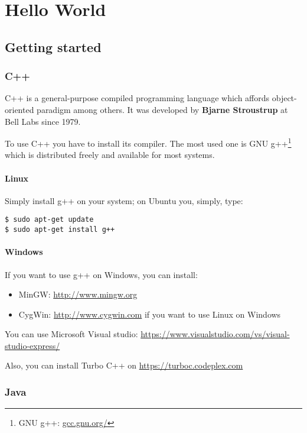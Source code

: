 \documentclass{KBook}
\begin{document}
	\chapter{Hello World}
\fi



\section{Getting started}

\subsection{C++}

C++ is a general-purpose compiled programming language which affords object-oriented paradigm among others. 
It was developed by \textbf{Bjarne Stroustrup} at Bell Labs since 1979.

To use C++ you have to install its compiler. 
The most used one is GNU g++\footnote{GNU g++: \url{gcc.gnu.org/}} which is distributed freely and available for most systems.

\subsubsection{Linux}
Simply install g++ on your system; on Ubuntu you, simply, type:
\begin{lstlisting}[style=shellStyle]
$ sudo apt-get update
$ sudo apt-get install g++
\end{lstlisting}

\subsubsection{Windows}

If you want to use g++ on Windows, you can install:
\begin{itemize}
	\item MinGW: \url{http://www.mingw.org} 
	\item CygWin: \url{http://www.cygwin.com} if you want to use Linux on Windows
\end{itemize}

You can use Microsoft Visual studio: \url{https://www.visualstudio.com/vs/visual-studio-express/}

Also, you can install Turbo C++ on \url{https://turboc.codeplex.com}

\subsection{Java}
\end{document}
